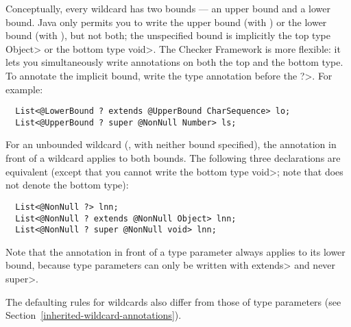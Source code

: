 Conceptually, every wildcard has two bounds --- an upper bound and a lower
bound.  Java only permits you to write the upper bound (with
) or the lower bound (with ), but not both; the unspecified bound is implicitly the
top type
\<Object> or the bottom type \<void>.  The Checker Framework is more
flexible:  it lets you simultaneously write annotations on both the top and
the bottom type.  To annotate the implicit bound, write the type annotation
before the \<?>.  For example:

\begin{Verbatim}
  List<@LowerBound ? extends @UpperBound CharSequence> lo;
  List<@UpperBound ? super @NonNull Number> ls;
\end{Verbatim}

For an unbounded wildcard (, with neither
bound specified), the annotation in front of a wildcard applies
to both bounds.  The following three declarations are equivalent (except
that you cannot write the bottom type \<void>; note that
 does not denote the bottom type):

\begin{Verbatim}
  List<@NonNull ?> lnn;
  List<@NonNull ? extends @NonNull Object> lnn;
  List<@NonNull ? super @NonNull void> lnn;
\end{Verbatim}

\noindent
Note that the annotation in front of a type parameter always applies to its
lower bound, because type parameters can only be written with \<extends>
and never \<super>.



The defaulting rules for
wildcards also differ from those of type parameters (see
Section~\ref{inherited-wildcard-annotations}).


